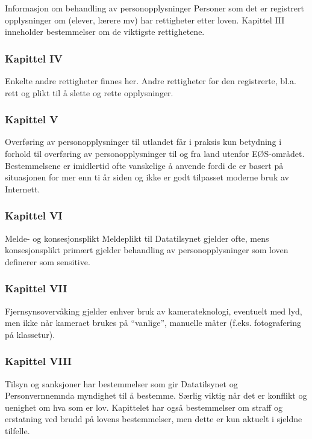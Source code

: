 \documentclass[11pt]{article}
\begin{document}
    Informasjon om behandling av personopplysninger
    Personer som det er registrert opplysninger om (elever, lærere mv) har rettigheter
    etter loven. Kapittel III inneholder bestemmelser om de viktigste rettighetene.
\subsubsection{Kapittel IV}
\label{sec-17.2.4}

    Enkelte andre rettigheter finnes her. Andre rettigheter for den registrerte,
    bl.a. rett og plikt til å slette og rette opplysninger.
\subsubsection{Kapittel V}
\label{sec-17.2.5}

    Overføring av personopplysninger til utlandet får i praksis kun betydning
    i forhold til overføring av personopplysninger til og fra land utenfor EØS-området. 
    Bestemmelsene er imidlertid ofte vanskelige å anvende fordi de er basert på situasjonen
    for mer enn ti år siden og ikke er godt tilpasset moderne bruk av Internett.
\subsubsection{Kapittel VI}
\label{sec-17.2.6}

    Melde- og konsesjonsplikt Meldeplikt til Datatilsynet gjelder ofte, mens konsesjonsplikt 
    primært gjelder behandling av personopplysninger som loven definerer som sensitive.
\subsubsection{Kapittel VII}
\label{sec-17.2.7}

    Fjernsynsovervåking gjelder enhver bruk av kamerateknologi, eventuelt med lyd, men
    ikke når kameraet brukes på ``vanlige'', manuelle måter (f.eks. fotografering på 
    klassetur).
\subsubsection{Kapittel VIII}
\label{sec-17.2.8}

    Tilsyn og sanksjoner har bestemmelser som gir Datatilsynet og Personvernnemnda
    myndighet til å bestemme. Særlig viktig når det er konflikt og uenighet om hva 
    som er lov. Kapittelet har også bestemmelser om straff og erstatning ved brudd
    på lovens bestemmelser, men dette er kun aktuelt i sjeldne tilfelle.
\end{document}
